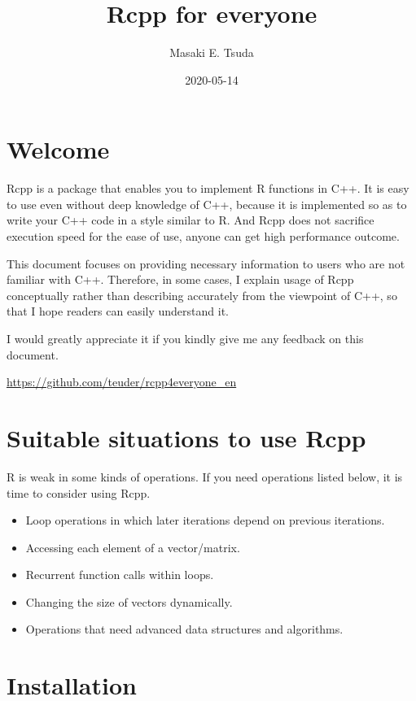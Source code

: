 \documentclass[]{book}
\title{Rcpp for everyone}
\author{Masaki E. Tsuda}
\date{2020-05-14}
\providecommand{\tightlist}{%
  \setlength{\itemsep}{0pt}\setlength{\parskip}{0pt}}
\begin{document}
\maketitle

{
\setcounter{tocdepth}{1}
\tableofcontents
}
\hypertarget{welcome}{%
\chapter*{Welcome}\label{welcome}}

Rcpp is a package that enables you to implement R functions in C++. It is easy to use even without deep knowledge of C++, because it is implemented so as to write your C++ code in a style similar to R. And Rcpp does not sacrifice execution speed for the ease of use, anyone can get high performance outcome.

This document focuses on providing necessary information to users who are not familiar with C++. Therefore, in some cases, I explain usage of Rcpp conceptually rather than describing accurately from the viewpoint of C++, so that I hope readers can easily understand it.

I would greatly appreciate it if you kindly give me any feedback on this document.

\url{https://github.com/teuder/rcpp4everyone_en}

\hypertarget{suitable-situations-to-use-rcpp}{%
\chapter{Suitable situations to use Rcpp}\label{suitable-situations-to-use-rcpp}}

R is weak in some kinds of operations. If you need operations listed below, it is time to consider using Rcpp.

\begin{itemize}
\tightlist
\item
  Loop operations in which later iterations depend on previous iterations.
\item
  Accessing each element of a vector/matrix.
\item
  Recurrent function calls within loops.
\item
  Changing the size of vectors dynamically.
\item
  Operations that need advanced data structures and algorithms.
\end{itemize}

\hypertarget{installation}{%
\chapter{Installation}\label{installation}}
\end{document}
